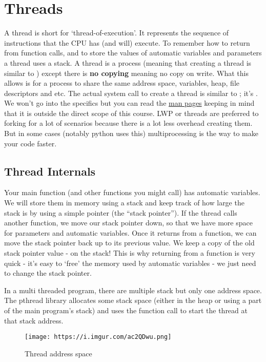 \chapter{Threads}


A thread is short for `thread-of-execution'. It represents the sequence of instructions that the CPU has (and will) execute. To remember how to return from function calls, and to store the values of automatic variables and parameters a thread uses a stack. A thread is a process (meaning that creating a thread is similar to ) except there is \textbf{no copying} meaning no copy on write. What this allows is for a process to share the same address space, variables, heap, file descriptors and etc. The actual system call to create a thread is similar to ; it's . We won't go into the specifics but you can read the \href{http://man7.org/linux/man-pages/man2/clone.2.html}{man pages} keeping in mind that it is outside the direct scope of this course. LWP or threads are preferred to forking for a lot of scenarios because there is a lot less overhead creating them. But in some cases (notably python uses this) multiprocessing is the way to make your code faster.

\section{Thread Internals}

Your main function (and other functions you might call) has automatic variables. We will store them in memory using a stack and keep track of how large the stack is by using a simple pointer (the ``stack pointer''). If the thread calls another function, we move our stack pointer down, so that we have more space for parameters and automatic variables. Once it returns from a function, we can move the stack pointer back up to its previous value. We keep a copy of the old stack pointer value - on the stack! This is why returning from a function is very quick - it's easy to `free' the memory used by automatic variables - we just need to change the stack pointer.

In a multi threaded program, there are multiple stack but only one address space. The pthread library allocates some stack space (either in the heap or using a part of the main program's stack) and uses the  function call to start the thread at that stack address.

\begin{figure}[htbp]
\centering
\texttt{[image: https://i.imgur.com/ac2QDwu.png]}
\caption{Thread address space}
\end{figure}

